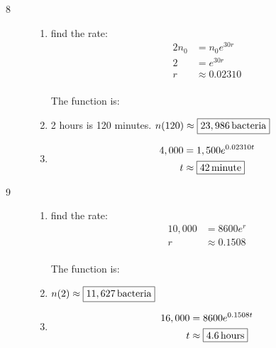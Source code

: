 \documentclass{exam}
\begin{document}
\begin{description}
\begin{enumerate}[a]
        \end{enumerate}

      \pagebreak

      \item[8] 
        \begin{enumerate}[a]
          \item find the rate:
            \begin{align*}
              2n_0 & = n_0 e^{30r} \\
              2    & =  e^{30r} \\
              r    & \approx 0.02310 \\
            \end{align*}

            The function is: 

          \item 2 hours is 120 minutes.  $n(120) \approx \boxed{\unit[23,986]{bacteria}}$

          \item 
            \begin{align*}
              4,000 & = 1,500 e^{0.02310 t} \\
              t     & \approx \boxed{\unit[42]{minute}} \\
            \end{align*}

        \end{enumerate}

      \item[9] 
        \begin{enumerate}[a]
          \item find the rate:
            \begin{align*}
              10,000 & = 8600 e^{r} \\
              r      & \approx 0.1508 \\
            \end{align*}

            The function is: 

          \item $n(2) \approx \boxed{\unit[11,627]{bacteria}}$

          \item 
            \begin{align*}
              16,000 & = 8600 e^{0.1508 t} \\
              t      & \approx \boxed{\unit[4.6]{hours}} \\
            \end{align*}


\end{enumerate}
\end{description}
\end{document}
